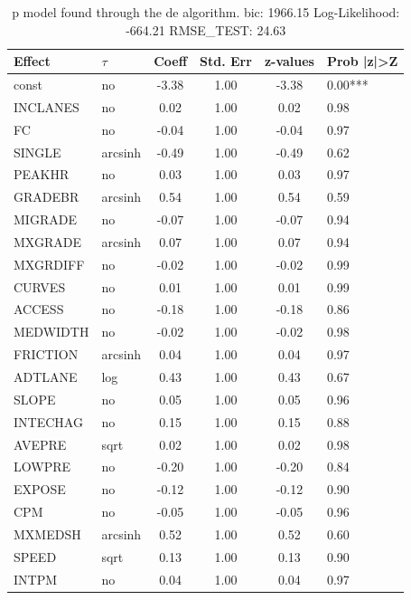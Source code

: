 \begin{table}
	\caption{p model found through the de algorithm. bic: 1966.15 Log-Likelihood: -664.21 RMSE_TEST: 24.63}
	\begin{center}
		\begin{tabular}{|l|l|c|c|c|l|}
			\hline
			Effect & $\tau$ & Coeff & Std. Err & z-values & Prob |z|>Z \\
			\hline
			const & no & -3.38 & 1.00 & -3.38 & 0.00*** \\
			\hline
			INCLANES & no & 0.02 & 1.00 & 0.02 & 0.98 \\
			\hline
			FC & no & -0.04 & 1.00 & -0.04 & 0.97 \\
			\hline
			SINGLE & arcsinh & -0.49 & 1.00 & -0.49 & 0.62 \\
			\hline
			PEAKHR & no & 0.03 & 1.00 & 0.03 & 0.97 \\
			\hline
			GRADEBR & arcsinh & 0.54 & 1.00 & 0.54 & 0.59 \\
			\hline
			MIGRADE & no & -0.07 & 1.00 & -0.07 & 0.94 \\
			\hline
			MXGRADE & arcsinh & 0.07 & 1.00 & 0.07 & 0.94 \\
			\hline
			MXGRDIFF & no & -0.02 & 1.00 & -0.02 & 0.99 \\
			\hline
			CURVES & no & 0.01 & 1.00 & 0.01 & 0.99 \\
			\hline
			ACCESS & no & -0.18 & 1.00 & -0.18 & 0.86 \\
			\hline
			MEDWIDTH & no & -0.02 & 1.00 & -0.02 & 0.98 \\
			\hline
			FRICTION & arcsinh & 0.04 & 1.00 & 0.04 & 0.97 \\
			\hline
			ADTLANE & log & 0.43 & 1.00 & 0.43 & 0.67 \\
			\hline
			SLOPE & no & 0.05 & 1.00 & 0.05 & 0.96 \\
			\hline
			INTECHAG & no & 0.15 & 1.00 & 0.15 & 0.88 \\
			\hline
			AVEPRE & sqrt & 0.02 & 1.00 & 0.02 & 0.98 \\
			\hline
			LOWPRE & no & -0.20 & 1.00 & -0.20 & 0.84 \\
			\hline
			EXPOSE & no & -0.12 & 1.00 & -0.12 & 0.90 \\
			\hline
			CPM & no & -0.05 & 1.00 & -0.05 & 0.96 \\
			\hline
			MXMEDSH & arcsinh & 0.52 & 1.00 & 0.52 & 0.60 \\
			\hline
			SPEED & sqrt & 0.13 & 1.00 & 0.13 & 0.90 \\
			\hline
			INTPM & no & 0.04 & 1.00 & 0.04 & 0.97 \\

\end{tabular}
\end{center}
\end{table}
